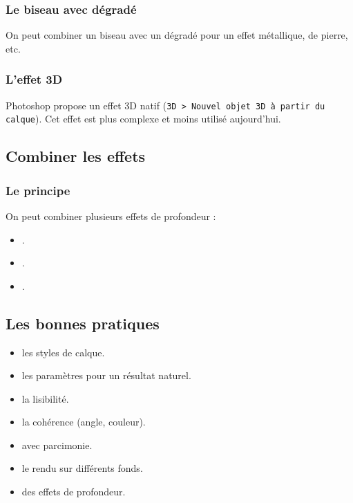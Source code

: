 \subsubsection{Le biseau avec dégradé}

On peut combiner un biseau avec un dégradé pour un effet métallique, de pierre, etc.

\subsubsection{L'effet 3D}

Photoshop propose un effet 3D natif (\texttt{3D > Nouvel objet 3D à partir du calque}). Cet effet est plus complexe et moins utilisé aujourd'hui.

\subsection{Combiner les effets}

\subsubsection{Le principe}

On peut combiner plusieurs effets de profondeur :

\begin{itemize}
    \item {}.
    \item {}.
    \item {}.
\end{itemize}

\subsection{Les bonnes pratiques}

\begin{itemize}
    \item {} les styles de calque.
    \item {} les paramètres pour un résultat naturel.
    \item {} la lisibilité.
    \item {} la cohérence (angle, couleur).
    \item {} avec parcimonie.
    \item {} le rendu sur différents fonds.
    \item {} des effets de profondeur.
\end{itemize}

